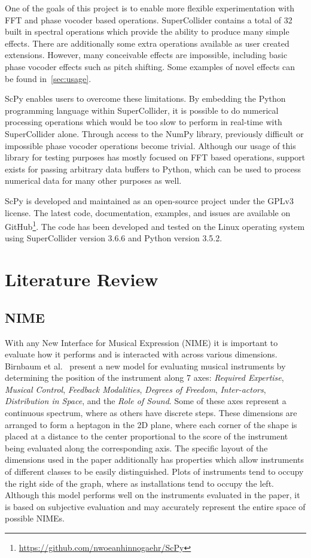 \documentclass{article}
\begin{document}
One of the goals of this project is to enable more flexible experimentation with FFT and phase
vocoder based operations. SuperCollider contains a total of 32 built in spectral operations
which provide the ability to produce many simple effects. There are additionally some extra
operations available as user created extensions. However, many conceivable effects are impossible,
including basic phase vocoder effects such as pitch shifting. Some examples of novel effects can
be found in~\autoref{sec:usage}.

ScPy enables users to overcome these limitations. By embedding the Python programming language
within SuperCollider, it is possible to do numerical processing operations which would be too slow
to perform in real-time with SuperCollider alone. Through access to the NumPy library, previously
difficult or impossible phase vocoder operations become trivial. Although our usage of this library
for testing purposes has mostly focused on FFT based operations, support exists for passing
arbitrary data buffers to Python, which can be used to process numerical data for many other
purposes as well.

ScPy is developed and maintained as an open-source project under the GPLv3 license. The latest
code, documentation, examples, and issues are available on
GitHub\footnote{\url{https://github.com/nwoeanhinnogaehr/ScPy}}. The code has been developed and
tested on the Linux operating system using SuperCollider version 3.6.6 and Python version 3.5.2.

\section{Literature Review}\label{sec:lit}

\subsection{NIME}

With any New Interface for Musical Expression (NIME) it is important to evaluate how it performs
and is interacted with across various dimensions. Birnbaum et al.~\cite{birnbaum2005towards}
present a new model for evaluating musical instruments by determining the position of the
instrument along 7 axes: \textit{Required Expertise}, \textit{Musical Control}, \textit{Feedback
Modalities}, \textit{Degrees of Freedom}, \textit{Inter-actors}, \textit{Distribution in Space},
and the \textit{Role of Sound}. Some of these axes represent a continuous spectrum, where as others
have discrete steps. These dimensions are arranged to form a heptagon in the 2D plane, where each
corner of the shape is placed at a distance to the center proportional to the score of the
instrument being evaluated along the corresponding axis. The specific layout of the dimensions used
in the paper additionally has properties which allow instruments of different classes to be easily
distinguished. Plots of instruments tend to occupy the right side of the graph, where as
installations tend to occupy the left. Although this model performs well on the instruments
evaluated in the paper, it is based on subjective evaluation and may accurately represent the entire
space of possible NIMEs.
\end{document}
